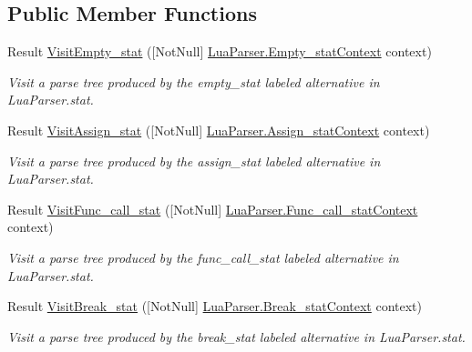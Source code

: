 \subsection*{Public Member Functions}
\begin{DoxyCompactItemize}
\item 
Result \mbox{\hyperlink{interfacezlua_1_1_i_lua_visitor_a947d61d77abed1edc930be81be7c3e8f}{Visit\+Empty\+\_\+stat}} (\mbox{[}Not\+Null\mbox{]} \mbox{\hyperlink{classzlua_1_1_lua_parser_1_1_empty__stat_context}{Lua\+Parser.\+Empty\+\_\+stat\+Context}} context)
\begin{DoxyCompactList}\small\item\em Visit a parse tree produced by the {\ttfamily empty\+\_\+stat} labeled alternative in Lua\+Parser.\+stat. \end{DoxyCompactList}\item 
Result \mbox{\hyperlink{interfacezlua_1_1_i_lua_visitor_a079bc4442510a3a834234725ef2b9673}{Visit\+Assign\+\_\+stat}} (\mbox{[}Not\+Null\mbox{]} \mbox{\hyperlink{classzlua_1_1_lua_parser_1_1_assign__stat_context}{Lua\+Parser.\+Assign\+\_\+stat\+Context}} context)
\begin{DoxyCompactList}\small\item\em Visit a parse tree produced by the {\ttfamily assign\+\_\+stat} labeled alternative in Lua\+Parser.\+stat. \end{DoxyCompactList}\item 
Result \mbox{\hyperlink{interfacezlua_1_1_i_lua_visitor_a3e00a13013b406b034c47f9dd4bc63d5}{Visit\+Func\+\_\+call\+\_\+stat}} (\mbox{[}Not\+Null\mbox{]} \mbox{\hyperlink{classzlua_1_1_lua_parser_1_1_func__call__stat_context}{Lua\+Parser.\+Func\+\_\+call\+\_\+stat\+Context}} context)
\begin{DoxyCompactList}\small\item\em Visit a parse tree produced by the {\ttfamily func\+\_\+call\+\_\+stat} labeled alternative in Lua\+Parser.\+stat. \end{DoxyCompactList}\item 
Result \mbox{\hyperlink{interfacezlua_1_1_i_lua_visitor_a858a13af948cd9098b3e70456040f96a}{Visit\+Break\+\_\+stat}} (\mbox{[}Not\+Null\mbox{]} \mbox{\hyperlink{classzlua_1_1_lua_parser_1_1_break__stat_context}{Lua\+Parser.\+Break\+\_\+stat\+Context}} context)
\begin{DoxyCompactList}\small\item\em Visit a parse tree produced by the {\ttfamily break\+\_\+stat} labeled alternative in Lua\+Parser.\+stat. \end{DoxyCompactList}\item 

\end{DoxyCompactItemize}
